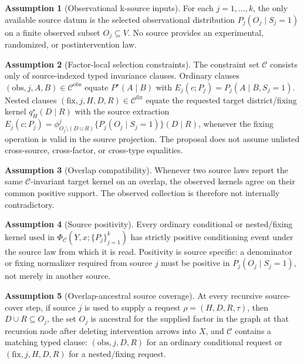 \documentclass[11pt]{article}
\theoremstyle{definition}
\newtheorem{assumption}{Assumption}
\theoremstyle{plain}
\theoremstyle{remark}
\begin{document}
\begin{assumption}[Observational k-source inputs]\label{ass:k-source-inputs}
For each \(j=1,\ldots,k\), the only available source datum is the selected
observational distribution \(P_j(O_j\mid S_j=1)\) on a finite observed subset
\(O_j\subseteq V\).  No source provides an experimental, randomized, or
postintervention law.
\end{assumption}

\begin{assumption}[Factor-local selection constraints]\label{ass:factor-local-C}
The constraint set \(\mathcal C\) consists only of source-indexed typed
invariance clauses.  Ordinary clauses
\((\mathrm{obs},j,A,B)\in\mathcal C^{\mathrm{obs}}\) equate
\(P^\star(A\mid B)\) with \(E_j(c;P_j)=P_j(A\mid B,S_j=1)\).  Nested clauses
\((\mathrm{fix},j,H,D,R)\in\mathcal C^{\mathrm{fix}}\) equate the requested
target district/fixing kernel \(q^\star_H(D\mid R)\) with the source
extraction \(E_j(c;P_j)=\phi^j_{O_j\setminus(D\cup R)}
\{P_j(O_j\mid S_j=1)\}(D\mid R)\), whenever the fixing operation is valid in
the source projection.  The proposal does not assume unlisted cross-source,
cross-factor, or cross-type equalities.
\end{assumption}

\begin{assumption}[Overlap compatibility]\label{ass:overlap-compat}
Whenever two source laws report the same \(\mathcal C\)-invariant target
kernel on an overlap, the observed kernels agree on their common positive
support.  The observed collection is therefore not internally contradictory.
\end{assumption}

\begin{assumption}[Source positivity]\label{ass:source-positivity}
Every ordinary conditional or nested/fixing kernel used in
\(\Phi_{\mathcal C}(Y,x;\{P_j\}_{j=1}^k)\) has strictly positive conditioning
event under the source law from which it is read.  Positivity is source
specific: a denominator or fixing normalizer required from source \(j\) must
be positive in \(P_j(O_j\mid S_j=1)\), not merely in another source.
\end{assumption}

\begin{assumption}[Overlap-ancestral source coverage]\label{ass:overlap-ancestral}
At every recursive source-cover step, if source \(j\) is used to supply a
request \(\rho=(H,D,R,\tau)\), then \(D\cup R\subseteq O_j\), the set
\(O_j\) is ancestral for the supplied factor in the graph at that recursion
node after deleting intervention arrows into \(X\), and \(\mathcal C\)
contains a matching typed clause: \((\mathrm{obs},j,D,R)\) for an ordinary
conditional request or \((\mathrm{fix},j,H,D,R)\) for a nested/fixing request.
\end{assumption}
\end{document}
